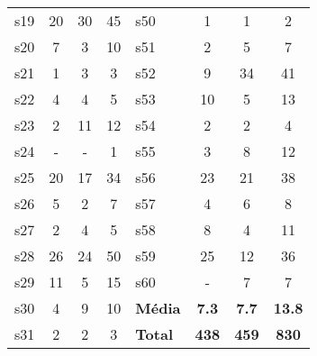 \begin{longtable}{ l c c c | l c c c }
s19 & 20 & 30 & 45 & s50 & 1 & 1 & 2 \\
s20 & 7 & 3 & 10 & s51 & 2 & 5 & 7 \\
s21 & 1 & 3 & 3 & s52 & 9 & 34 & 41 \\
s22 & 4 & 4 & 5 & s53 & 10 & 5 & 13 \\
s23 & 2 & 11 & 12 & s54 & 2 & 2 & 4 \\
s24 & - & - & 1 & s55 & 3 & 8 & 12 \\
s25 & 20 & 17 & 34 & s56 & 23 & 21 & 38 \\
s26 & 5 & 2 & 7 & s57 & 4 & 6 & 8 \\
s27 & 2 & 4 & 5 & s58 & 8 & 4 & 11 \\
s28 & 26 & 24 & 50 & s59 & 25 & 12 & 36 \\
s29 & 11 & 5 & 15 & s60 & - & 7 & 7 \\
s30 & 4 & 9 & 10 & {\bf Média} & {\bf 7.3} & {\bf 7.7} & {\bf 13.8} \\
s31 & 2 & 2 & 3 & {\bf Total} & {\bf 438} & {\bf 459} & {\bf 830} \\
\end{longtable}

